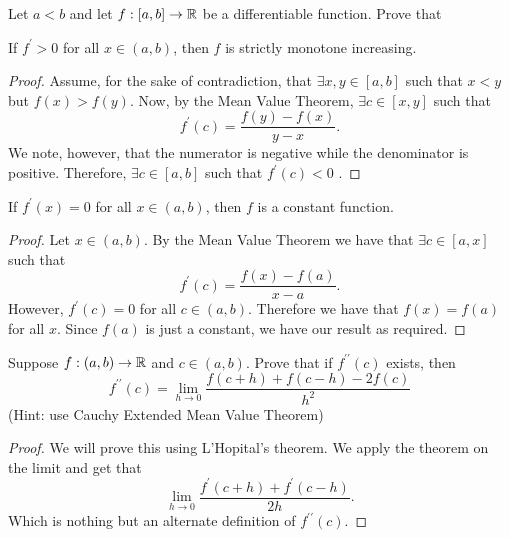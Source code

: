 \documentclass[twoside]{article}
\begin{document}
    Let $a < b$ and let $f : [a, b ] \to \mathbb{R}$ be a differentiable function. Prove that

    If $f^{\prime} > 0$ for all $x \in (a, b)$, then $f$ is strictly monotone increasing.
    \begin{proof}
        Assume, for the sake of contradiction, that $\exists x, y \in [a, b]$ such that $x < y$ but $f(x) > f(y)$.
        Now, by the Mean Value Theorem, $\exists c \in [x,y]$ such that 
        \begin{equation*}
            f^{\prime}(c) = \frac{f(y) - f(x)}{y - x}.
        \end{equation*}
        We note, however, that the numerator is negative while the denominator is positive.
        Therefore, $\exists c \in [a, b]$ such that $f^{\prime}(c) < 0$ \contra.
    \end{proof}

    If $f^{\prime}(x) = 0$ for all $x \in (a,b)$, then $f $ is a constant function.

    \begin{proof}
        Let $x \in (a,b)$.
        By the Mean Value Theorem we have that $\exists c \in [a, x]$ such that 
        \begin{equation*}
            f^{\prime}(c) = \frac{f(x) - f(a)}{x - a}.
        \end{equation*}
        However, $f^{\prime}(c) = 0$ for all $c \in (a,b)$. Therefore we have that $f(x) = f(a)$ for all $x$.
        Since $f(a)$ is just a constant, we have our result as required.
    \end{proof}

    \newpage
    Suppose $f : (a,b) \to \mathbb{R}$ and $c \in (a,b)$. Prove that if $f^{\prime\prime}(c)$ exists, then
    \begin{equation*}
        f^{\prime\prime}(c) = \lim_{h\to 0} \frac{f(c + h) + f(c - h) - 2f(c)}{h^{2}}
    \end{equation*}
    (Hint: use Cauchy Extended Mean Value Theorem)

    \begin{proof}
        We will prove this using L'Hopital's theorem. We apply the theorem on the limit and get that
        \begin{equation*}
            \lim_{h \to 0} \frac{f^{\prime}(c + h) + f^{\prime}(c - h)}{2h}.
        \end{equation*}
        Which is nothing but an alternate definition of $f^{\prime\prime}(c)$.
    \end{proof}
\end{document}
